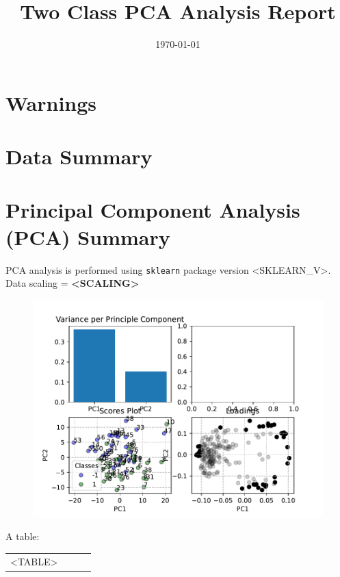 \documentclass[]{article}
\title{Two Class PCA Analysis Report}
\author{}
\date{\today}
\begin{document}
\begin{titlepage}
    \maketitle
    \section*{Warnings}
    \section*{Data Summary}
\end{titlepage}

\section*{Principal Component Analysis (PCA) Summary}
    PCA analysis is performed using \texttt{sklearn} package version <SKLEARN_V>. \\
    Data scaling = \textbf{<SCALING>}

    \begin{figure}[h!]
    \includegraphics{<SUMMARY_FIGS>}
    \end{figure}

A table:
\begin{tabular}{ c | c | c | c }
<TABLE>
\end{tabular}
\end{document}
